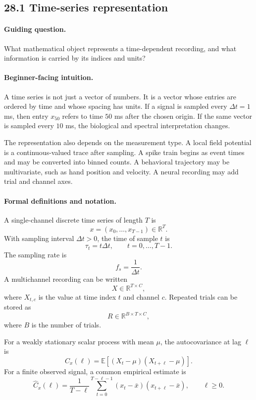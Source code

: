 \subsection{28.1 Time-series representation}

\paragraph{Guiding question.}
What mathematical object represents a time-dependent recording, and what information is carried by its indices and units?

\paragraph{Beginner-facing intuition.}
A time series is not just a vector of numbers. It is a vector whose entries are ordered by time and whose spacing has units. If a signal is sampled every \(\Delta t=1\) ms, then entry \(x_{50}\) refers to time \(50\) ms after the chosen origin. If the same vector is sampled every \(10\) ms, the biological and spectral interpretation changes.

The representation also depends on the measurement type. A local field potential is a continuous-valued trace after sampling. A spike train begins as event times and may be converted into binned counts. A behavioral trajectory may be multivariate, such as hand position and velocity. A neural recording may add trial and channel axes.

\paragraph{Formal definitions and notation.}
A single-channel discrete time series of length \(T\) is
\[
x=(x_0,\ldots,x_{T-1})\in\mathbb R^T.
\]
With sampling interval \(\Delta t>0\), the time of sample \(t\) is
\[
\tau_t=t\Delta t,\qquad t=0,\ldots,T-1.
\]
The sampling rate is
\[
f_s=\frac{1}{\Delta t}.
\]
A multichannel recording can be written
\[
X\in\mathbb R^{T\times C},
\]
where \(X_{t,c}\) is the value at time index \(t\) and channel \(c\). Repeated trials can be stored as
\[
R\in\mathbb R^{B\times T\times C},
\]
where \(B\) is the number of trials.

For a weakly stationary scalar process with mean \(\mu\), the autocovariance at lag \(\ell\) is
\[
C_x(\ell)=\mathbb E[(X_t-\mu)(X_{t+\ell}-\mu)].
\]
For a finite observed signal, a common empirical estimate is
\[
\widehat C_x(\ell)=\frac{1}{T-\ell}\sum_{t=0}^{T-\ell-1}(x_t-\bar x)(x_{t+\ell}-\bar x),
\qquad \ell\geq0.
\]


